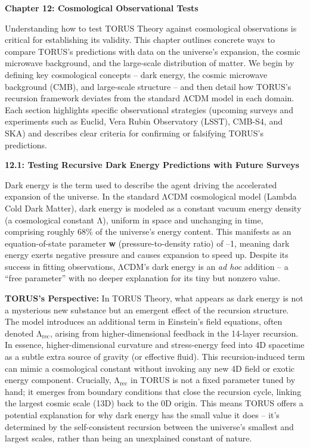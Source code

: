 \documentclass[]{article}
\date{}
\newcommand{\subscript}[1]{\ensuremath{_{\mathrm{#1}}}}
\begin{document}
\textbf{Chapter 12: Cosmological Observational Tests}

Understanding how to test TORUS Theory against cosmological observations
is critical for establishing its validity. This chapter outlines
concrete ways to compare TORUS's predictions with data on the universe's
expansion, the cosmic microwave background, and the large-scale
distribution of matter. We begin by defining key cosmological concepts
-- dark energy, the cosmic microwave background (CMB), and large-scale
structure -- and then detail how TORUS's recursion framework deviates
from the standard ΛCDM model in each domain. Each section highlights
specific observational strategies (upcoming surveys and experiments such
as Euclid, Vera Rubin Observatory (LSST), CMB-S4, and SKA) and describes
clear criteria for confirming or falsifying TORUS's predictions.

\textbf{12.1: Testing Recursive Dark Energy Predictions with Future
Surveys}

Dark energy is the term used to describe the agent driving the
accelerated expansion of the universe. In the standard ΛCDM cosmological
model (Lambda Cold Dark Matter), dark energy is modeled as a constant
vacuum energy density (a cosmological constant Λ), uniform in space and
unchanging in time, comprising roughly 68\% of the universe's energy
content. This manifests as an equation-of-state parameter \textbf{w}
(pressure-to-density ratio) of --1, meaning dark energy exerts negative
pressure and causes expansion to speed up. Despite its success in
fitting observations, ΛCDM's dark energy is an \emph{ad hoc} addition --
a ``free parameter'' with no deeper explanation for its tiny but nonzero
value.

\textbf{TORUS's Perspective:} In TORUS Theory, what appears as dark
energy is not a mysterious new substance but an emergent effect of the
recursion structure. The model introduces an additional term in
Einstein's field equations, often denoted
Λ\subscript{rec}, arising
from higher-dimensional feedback in the 14-layer recursion. In essence,
higher-dimensional curvature and stress-energy feed into 4D spacetime as
a subtle extra source of gravity (or effective fluid). This
recursion-induced term can mimic a cosmological constant without
invoking any new 4D field or exotic energy component. Crucially,
Λ\subscript{rec} in TORUS
is not a fixed parameter tuned by hand; it emerges from boundary
conditions that close the recursion cycle, linking the largest cosmic
scale (13D) back to the 0D origin. This means TORUS offers a potential
explanation for why dark energy has the small value it does -- it's
determined by the self-consistent recursion between the universe's
smallest and largest scales, rather than being an unexplained constant
of nature.
\end{document}
